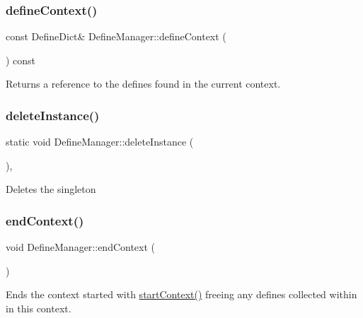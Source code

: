 \subsubsection{\texorpdfstring{defineContext()}{defineContext()}}
{\footnotesize\ttfamily const Define\+Dict\& Define\+Manager\+::define\+Context (\begin{DoxyParamCaption}{ }\end{DoxyParamCaption}) const\hspace{0.3cm}{\ttfamily [inline]}}

Returns a reference to the defines found in the current context. \mbox{\label{class_define_manager_ad3ccd619d92e9bd8e7e7357c6db68cbb}} 
\subsubsection{\texorpdfstring{deleteInstance()}{deleteInstance()}}
{\footnotesize\ttfamily static void Define\+Manager\+::delete\+Instance (\begin{DoxyParamCaption}{ }\end{DoxyParamCaption})\hspace{0.3cm}{\ttfamily [inline]}, {\ttfamily [static]}}

Deletes the singleton \mbox{\label{class_define_manager_aee1f4c46242ef774c2bb68fb546df57d}} 
\subsubsection{\texorpdfstring{endContext()}{endContext()}}
{\footnotesize\ttfamily void Define\+Manager\+::end\+Context (\begin{DoxyParamCaption}{ }\end{DoxyParamCaption})\hspace{0.3cm}{\ttfamily [inline]}}

Ends the context started with \mbox{\hyperlink{class_define_manager_afbecee8baeba40d35a068f7f3e53fe3e}{start\+Context()}} freeing any defines collected within in this context. \mbox{\label{class_define_manager_abadbf233461748c2d5f037874c58c375}} 
